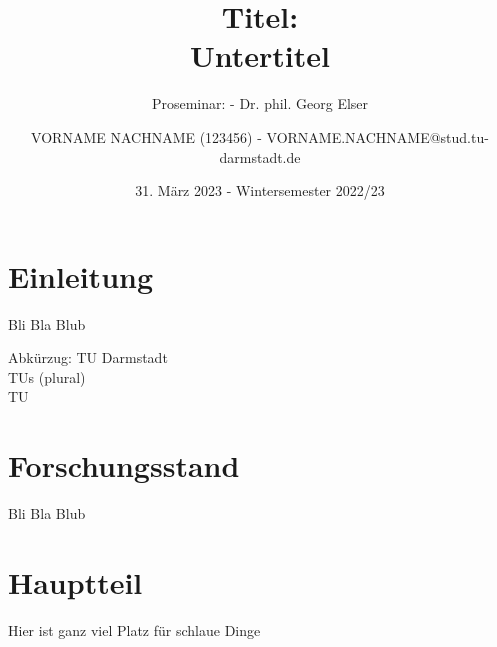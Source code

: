 \documentclass[
	ngerman, 
	fontsize=9pt,
	accentcolor=1b,%
	type=intern,
	marginpar=false,
	]{tudapub}
\begin{document}
\title{Titel: \\ Untertitel}
\subtitle{Proseminar:  - Dr. phil. Georg Elser}
\author{VORNAME NACHNAME (123456) - VORNAME.NACHNAME@stud.tu-darmstadt.de }
\date{31. März 2023 - Wintersemester 2022/23} %

\maketitle
{} 
\fontsize{12pt}{14.4}\selectfont %

\tableofcontents
\newpage




\section{Einleitung}
\begin{changemargin}{0.5cm}{0.5cm}

Bli Bla Blub

Abkürzug: \ac{TU} Darmstadt \\ \acp{TU} (plural) \\ \ac{TU}


\end{changemargin}


\section{Forschungsstand}
\begin{changemargin}{0.5cm}{0.5cm}

Bli Bla Blub

\end{changemargin}


\section{Hauptteil}
\begin{changemargin}{0.5cm}{0.5cm}

Hier ist ganz viel Platz für schlaue Dinge \citep{murphyGlobalGovernancePoorly2000}

\end{changemargin}
\end{document}
